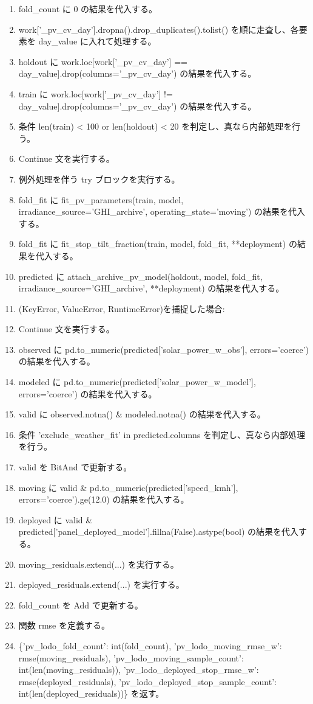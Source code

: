 \documentclass[a4paper,11pt]{article}
\begin{document}
\begin{enumerate}[leftmargin=1.8em]
\item fold\_count に 0 の結果を代入する。
\item work['\_pv\_cv\_day'].dropna().drop\_duplicates().tolist() を順に走査し、各要素を day\_value に入れて処理する。
\item   holdout に work.loc[work['\_pv\_cv\_day'] == day\_value].drop(columns='\_pv\_cv\_day') の結果を代入する。
\item   train に work.loc[work['\_pv\_cv\_day'] != day\_value].drop(columns='\_pv\_cv\_day') の結果を代入する。
\item   条件 len(train) < 100 or len(holdout) < 20 を判定し、真なら内部処理を行う。
\item     Continue 文を実行する。
\item   例外処理を伴う try ブロックを実行する。
\item     fold\_fit に fit\_pv\_parameters(train, model, irradiance\_source='GHI\_archive', operating\_state='moving') の結果を代入する。
\item     fold\_fit に fit\_stop\_tilt\_fraction(train, model, fold\_fit, **deployment) の結果を代入する。
\item     predicted に attach\_archive\_pv\_model(holdout, model, fold\_fit, irradiance\_source='GHI\_archive', **deployment) の結果を代入する。
\item     (KeyError, ValueError, RuntimeError)を捕捉した場合:
\item     Continue 文を実行する。
\item   observed に pd.to\_numeric(predicted['solar\_power\_w\_obs'], errors='coerce') の結果を代入する。
\item   modeled に pd.to\_numeric(predicted['solar\_power\_w\_model'], errors='coerce') の結果を代入する。
\item   valid に observed.notna() \& modeled.notna() の結果を代入する。
\item   条件 'exclude\_weather\_fit' in predicted.columns を判定し、真なら内部処理を行う。
\item     valid を BitAnd で更新する。
\item   moving に valid \& pd.to\_numeric(predicted['speed\_kmh'], errors='coerce').ge(12.0) の結果を代入する。
\item   deployed に valid \& predicted['panel\_deployed\_model'].fillna(False).astype(bool) の結果を代入する。
\item   moving\_residuals.extend(...) を実行する。
\item   deployed\_residuals.extend(...) を実行する。
\item   fold\_count を Add で更新する。
\item 関数 rmse を定義する。
\item \{'pv\_lodo\_fold\_count': int(fold\_count), 'pv\_lodo\_moving\_rmse\_w': rmse(moving\_residuals), 'pv\_lodo\_moving\_sample\_count': int(len(moving\_residuals)), 'pv\_lodo\_deployed\_stop\_rmse\_w': rmse(deployed\_residuals), 'pv\_lodo\_deployed\_stop\_sample\_count': int(len(deployed\_residuals))\} を返す。
            \end{enumerate}
\end{document}
